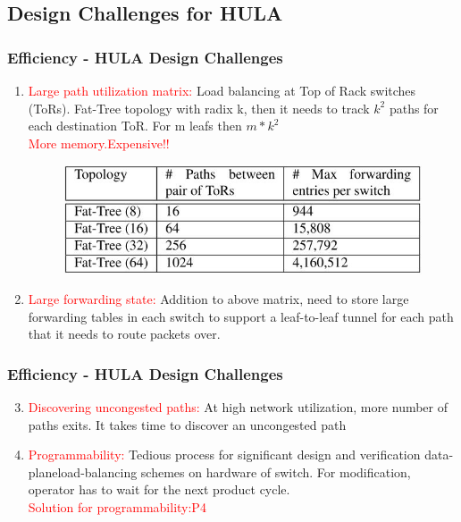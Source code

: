 \documentclass{beamer}
\begin{document}
\subsection{Design Challenges for HULA}
\begin{frame}
	\frametitle{Efficiency - HULA Design Challenges}
	\begin{enumerate}
		\item\textcolor{red}{Large path utilization matrix:} Load balancing at Top of Rack switches (ToRs). Fat-Tree topology with radix
		k, then it needs to track ${k^2}$ paths for each destination ToR. For m leafs then ${m*k^2}$\\
		\textcolor{red}{More memory.Expensive!!}
		\begin{figure}
			\includegraphics[width=0.6\linewidth]{7}
		\end{figure}
		\item\textcolor{red}{Large forwarding state:} Addition to above matrix, need to store large forwarding tables in each switch to support a leaf-to-leaf tunnel for each path that it needs to route packets over.
	\end{enumerate}
\end{frame}


\begin{frame}
	\frametitle{Efficiency - HULA Design Challenges}
	\begin{enumerate}
		\setcounter{enumi}{2}
			\item\textcolor{red}{Discovering uncongested paths:} At high network utilization, more number of paths exits. It takes time to discover an uncongested path
			\item\textcolor{red}{Programmability:} Tedious process for significant design and verification data-planeload-balancing schemes on hardware of switch. For modification, operator has to wait for the next product cycle.\\
			\textcolor{red}{Solution for programmability:P4}
	\end{enumerate}
\end{frame}
\end{document}
